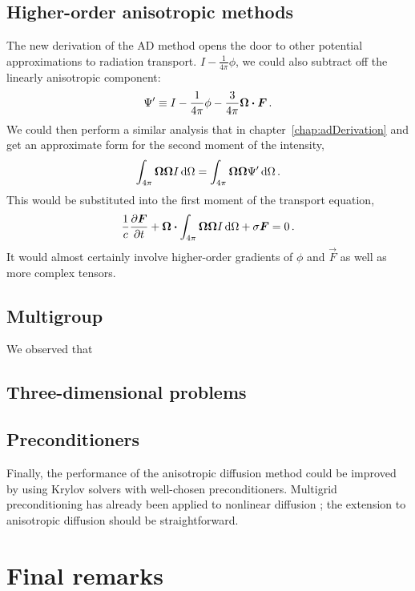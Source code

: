 \subsection{Higher-order anisotropic \texorpdfstring{\PN}{PN} methods}
The new derivation of the AD method opens the door to other potential
approximations to radiation transport.  $I -
\frac{1}{4\pi}\phi$, we could also subtract off the linearly anisotropic
component:
\begin{equation*}
  \Psi' \equiv I - \frac{1}{4\pi}\phi - \frac{3}{4\pi} \bm{\Omega} \bm{\cdot}
  \bm{F}\,.
\end{equation*}
We could then perform a similar analysis that in chapter~\ref{chap:adDerivation}
and get an approximate form for the second moment of the intensity,
\begin{equation*}
  \int_{4\pi} \bm{\Omega}\bm{\Omega} I \mathop{}\!\mathrm{d} \Omega
  = \int_{4\pi} \bm{\Omega}\bm{\Omega} \Psi' \mathop{}\!\mathrm{d} \Omega \,.
\end{equation*}
This would be substituted into the first moment of the transport equation,
\begin{equation*}
  \frac{1}{c}\frac{\partial \bm{F}}{\partial t}
  + \bm{\Omega} \bm{\cdot} \int_{4\pi} \bm{\Omega}\bm{\Omega} I \mathop{}\!\mathrm{d} \Omega
  + \sigma \bm{F}
  = 0 \,.
\end{equation*}
It would almost certainly involve higher-order gradients of $\phi$ and $\vec{F}$
as well as more complex tensors.

\subsection{Multigroup}

We observed that 

\subsection{Three-dimensional problems}

\subsection{Preconditioners}

Finally, the performance of the anisotropic diffusion method could be improved
by using Krylov solvers with well-chosen preconditioners. Multigrid
preconditioning has already been applied to nonlinear diffusion \cite{Rid1999};
the extension to anisotropic diffusion should be straightforward.

\section{Final remarks}



